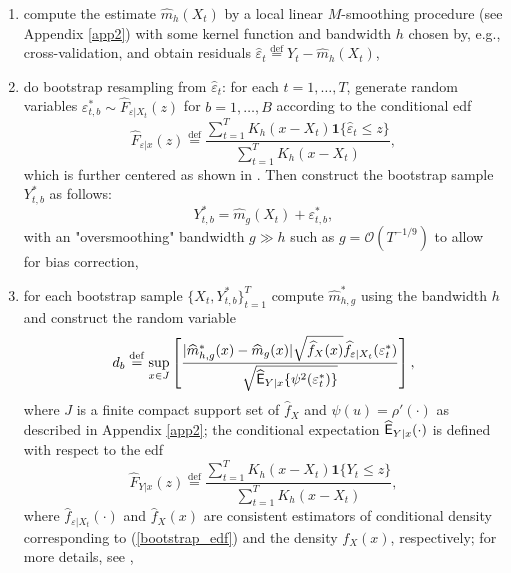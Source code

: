 \documentclass{rQUF2e}
\newcommand{\E}{\mathop{\mbox{\sf E}}}
\theoremstyle{plain}
\theoremstyle{definition}
\begin{document}
	\begin{enumerate}
		\item
		compute the estimate $\widehat{m}_h(X_t)$ by a local linear $M$-smoothing procedure (see Appendix \ref{app2}) with some kernel function and bandwidth $h$ chosen by, e.g., cross-validation, and obtain residuals $\widehat{\varepsilon}_t \stackrel{\operatorname{def}}{=} Y_t - \widehat{m}_h(X_t)$, 
		\item
		do bootstrap resampling from $\widehat{\varepsilon}_t$: for each $t = 1,\ldots,T$, generate random variables $\varepsilon_{t,b}^{*} \sim \widehat{F}_{\varepsilon|X_t}(z)$ for $b = 1, \ldots, B$ according to the conditional edf
		\begin{equation}
		\widehat{F}_{\varepsilon|x}(z) \stackrel{\operatorname{def}}{=} \frac{\sum_{t=1}^{T} K_h (x - X_t) \mathbf{1}\{\widehat{\varepsilon}_t \leq z\}}{\sum_{t=1}^{T} K_h (x - X_t)},
		\label{bootstrap_edf}
		\end{equation}
		which is further centered as shown in \citet{haerdle_ritov_wang}. Then construct the bootstrap sample $Y_{t,b}^{*}$ as follows:
		\begin{equation}
		Y_{t,b}^{*} = \widehat{m}_g(X_t) + \varepsilon_{t,b}^{*},
		\label{ybootresamp}
		\end{equation}
		with an "oversmoothing" bandwidth $g \gg h$ such as $g = \mathcal{O}(T^{-1/9})$ to allow for bias correction,
		\item
		for each bootstrap sample $\{X_t,Y_{t,b}^{*}\}_{t=1}^T$ compute $\widehat{m}_{h,g}^{*}$ using the bandwidth $h$ and construct the random variable
		\begin{equation}
		d_{b} \stackrel{\operatorname{def}}{=} \underset{x \in J}{\sup} \left[ \frac{|\widehat{m}_{h,g}^{*}(x) - \widehat{m}_{g}(x)| \sqrt{\widehat{f}_X (x)} \widehat{f}_{\varepsilon|X_t}(\varepsilon_t^{*})}{\sqrt{\widehat{\E}_{Y|x}\{\psi^2(\varepsilon_t^{*})\}}} \right],
		\end{equation}
		where $J$ is a finite compact support set of $\widehat{f}_X$ and $\psi(u) = \rho '(\cdot)$ as described in Appendix \ref{app2}; the conditional expectation $\widehat{\E}_{Y|x}(\cdot)$ is defined with respect to the edf
		\begin{equation}
		\widehat{F}_{Y|x}(z) \stackrel{\operatorname{def}}{=} \frac{\sum_{t=1}^{T} K_h (x - X_t) \mathbf{1}\{Y_t \leq z\}}{\sum_{t=1}^{T} K_h (x - X_t)},
		\label{expec_edf}
		\end{equation}
		where $\widehat{f}_{\varepsilon|X_t}(\cdot)$ and $\widehat{f}_X (x)$ are consistent estimators of conditional density corresponding to (\ref{bootstrap_edf}) and the density $f_X (x)$, respectively; for more details, see \citet{haerdle_ritov_wang},

\end{enumerate}
\end{document}
